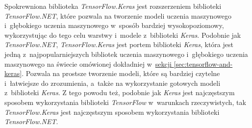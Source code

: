 Spokrewniona biblioteka \emph{TensorFlow.Keras} jest rozszerzeniem biblioteki \emph{TensorFlow.NET}, które pozwala na tworzenie modeli uczenia maszynowego i~głębokiego uczenia maszynowego w~sposób bardziej wysokopoziomowy, wykorzystując do tego celu warstwy i~modele z~biblioteki \emph{Keras}.
Podobnie jak \emph{TensorFlow.NET}, \emph{TensorFlow.Keras} jest portem biblioteki \emph{Keras}, która jest jedną z~najpopularniejszych bibliotek uczenia maszynowego i~głębokiego uczenia maszynowego na świecie omówionej dokładniej w~\hyperref[sec:tensorflow-and-keras]{sekcji \ref*{sec:tensorflow-and-keras}}.
Pozwala na prostsze tworzenie modeli, które są bardziej czytelne i~łatwiejsze do zrozumienia, a~także na wykorzystanie gotowych modeli z~biblioteki \emph{Keras}.
Z tego powodu też, podobnie jak \emph{Keras} jest najczęstszym sposobem wykorzystania biblioteki \emph{TensorFlow} w~warunkach rzeczywistych, tak \emph{TensorFlow.Keras} jest najczęstszym sposobem wykorzystania biblioteki \emph{TensorFlow.NET}.
